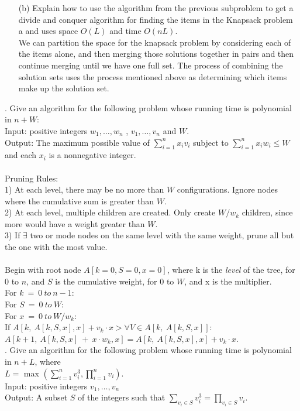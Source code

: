 \documentclass[10pt]{article}
\newcommand{\tab}{\hspace*{2em}}
\newcommand{\tabb}{\hspace*{4em}}
\newcommand{\tabbb}{\hspace*{6em}}
\newcommand{\tabbbb}{\hspace*{8em}}
\begin{document}
\begin{enumerate}
							
		\item[(b)]	Explain how to use the algorithm from the previous subproblem to get a divide and conquer
					algorithm for finding the items in the Knapsack problem a and uses space $O(L)$ and time $O(nL)$. \\
					We can partition the space for the knapsack problem by considering each of the items alone, and then 
					merging those solutions together in pairs and then continue merging until we have one full set. The 
					process of combining the solution sets uses the process mentioned above as determining which items
					make up the solution set. 
	\end{enumerate}
	\newpage
	.	Give an algorithm for the following problem whose running time is polynomial in $n + W$:\\ 
			Input: positive integers $w_1, \ldots, w_n$ , $v_1, \ldots, v_n$ and $W$.\\
			Output:  The maximum possible value of $\sum_{i=1}^n x_i v_i$ subject to $\sum_{i=1}^n x_i w_i \leq W$ and each $x_i$ is a
			nonnegative integer.\\
			\\
			Pruning Rules:\\
			1) At each level, there may be no more than $W$ configurations. Ignore nodes where the cumulative sum is greater than $W$.\\
			2) At each level, multiple children are created. Only create $W/w_k$ children, since more would have a weight greater than $W$.\\
			3) If $\exists$ two or mode nodes on the same level with the same weight, prune all but the one with the most value.\\
			\\
			Begin with root node $A[k=0, S=0, x=0]$, where k is the \textit{level} of the tree, for $0$ to $n$, and $S$ is the cumulative weight, for $0$ to $W$, and x
			is the multiplier.\\
			For $k~=~0~to~n-1$:\\
			\tab For $S~=~0~to~W$:\\
			\tabb For $x~=~0~to~W/w_k$:\\
			\tabbb If $A[k,~ A[k,S,x], x] + v_k \cdot x  > \forall V \in A[k,~ A[k,S,x]]:$\\ 
			\tabbbb $A[k+1,~A[k,S,x]~+~x\cdot w_k, x]= A[k,~ A[k,S,x], x] + v_k \cdot x$.\\
			\newpage
	\newpage
	. Give an algorithm for the following problem whose running time is polynomial in $n + L$, where \\
			$L =$ max $(\sum_{i=1}^n v_i^3, \prod_{i=1}^n v_i)$.\\
			Input: positive integers $v_1, \ldots, v_n$\\
			Output: A subset $S$ of the integers such that $\sum_{v_i \in S} v_i^3 = \prod_{v_i \in S} v_i$.
	
\end{document}
